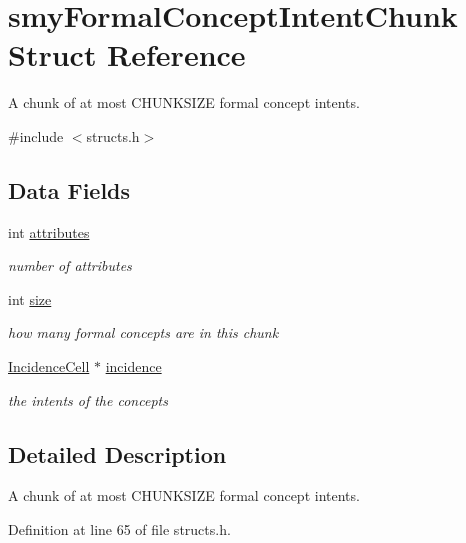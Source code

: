 \hypertarget{structsmyFormalConceptIntentChunk}{\section{smy\-Formal\-Concept\-Intent\-Chunk \-Struct \-Reference}
\label{structsmyFormalConceptIntentChunk}
}


\-A chunk of at most \-C\-H\-U\-N\-K\-S\-I\-Z\-E formal concept intents.  




{\ttfamily \#include $<$structs.\-h$>$}

\subsection*{\-Data \-Fields}
\begin{DoxyCompactItemize}
\item 
int \hyperlink{structsmyFormalConceptIntentChunk_a5246108db3d065d2b9c46fedfc88dc0e}{attributes}
\begin{DoxyCompactList}\small\item\em number of attributes \end{DoxyCompactList}\item 
int \hyperlink{structsmyFormalConceptIntentChunk_a39483f44afbcd1de56c41243c7a442aa}{size}
\begin{DoxyCompactList}\small\item\em how many formal concepts are in this chunk \end{DoxyCompactList}\item 
\hyperlink{fca_8h_a92fa84ef7a12663bb998f141ab729056}{\-Incidence\-Cell} $\ast$ \hyperlink{structsmyFormalConceptIntentChunk_a1777b5eadbd74c4659580968817b3424}{incidence}
\begin{DoxyCompactList}\small\item\em the intents of the concepts \end{DoxyCompactList}\end{DoxyCompactItemize}


\subsection{\-Detailed \-Description}
\-A chunk of at most \-C\-H\-U\-N\-K\-S\-I\-Z\-E formal concept intents. 

\-Definition at line 65 of file structs.\-h.



